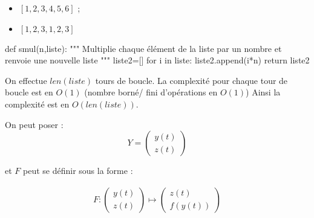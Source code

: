 \question{}

\begin{itemize}
\item $\left[1, 2, 3, 4, 5, 6\right]$ ;
\item $\left[1, 2, 3, 1, 2, 3\right]$
\end{itemize}

\question{}

\begin{pyverbatim}
def smul(n,liste):
	"""
	Multiplie chaque élément de la liste par un nombre et renvoie une nouvelle liste
	"""
	liste2=[]
	for i in liste:
		liste2.append(i*n) 
	return liste2
	
\end{pyverbatim}

\question{}

On effectue $len(liste)$ tours de boucle. La complexité pour chaque tour de boucle est en $O(1)$ (nombre borné/ fini d'opérations en $O(1)$) Ainsi la complexité est en $O(len(liste))$.


%
%
%
%

\question{} 



On peut poser :
$$Y=\left(
\begin{array}{c}
y(t)\\
z(t)
\end{array}
\right)$$

et $F$ peut se définir sous la forme : 

\begin{align*}
F:
\left(
\begin{array}{c}
y(t)\\
z(t)
\end{array}
\right)
\mapsto
\left(\begin{array}{c}
z(t)\\
f(y(t))
\end{array}
\right)
\end{align*} 

